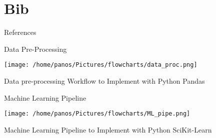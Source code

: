 \documentclass[10pt, aspectratio=169, presentation]{beamer}
\begin{document}
\section{Bib}
\label{sec:orgf046f29}
\begin{frame}[allowframebreaks]{References}
\AtNextBibliography{\tiny}
\printbibliography
\end{frame}
\appendix
\begin{frame}[label={sec:orgc715c61}]{Data Pre-Processing}
\begin{center}
\texttt{[image: /home/panos/Pictures/flowcharts/data\_proc.png]}
\end{center}
Data pre-processing Workflow to Implement with Python Pandas
\end{frame}
\begin{frame}[label={sec:org6140282}]{Machine Learning Pipeline}
\begin{center}
\texttt{[image: /home/panos/Pictures/flowcharts/ML\_pipe.png]}
\end{center}
Machine Learning Pipeline to Implement with Python SciKit-Learn
\end{frame}
\end{document}
